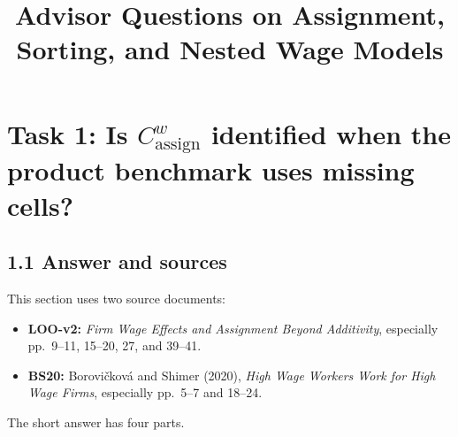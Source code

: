 \documentclass[11pt]{article}
\title{Advisor Questions on Assignment, Sorting, and Nested Wage Models}
\author{}
\date{}
\begin{document}
\maketitle

\section{Task 1: Is \(C^w_{\mathrm{assign}}\) identified when the product benchmark uses missing cells?}

\subsection{1.1 Answer and sources}

This section uses two source documents:

\begin{itemize}
\item \textbf{LOO-v2:} \emph{Firm Wage Effects and Assignment Beyond Additivity},
  especially pp.\ 9--11, 15--20, 27, and 39--41.
\item \textbf{BS20:} Borovi\v{c}kov\'a and Shimer (2020),
  \emph{High Wage Workers Work for High Wage Firms}, especially pp.\ 5--7 and
  18--24.
\end{itemize}

The short answer has four parts.
\end{document}
